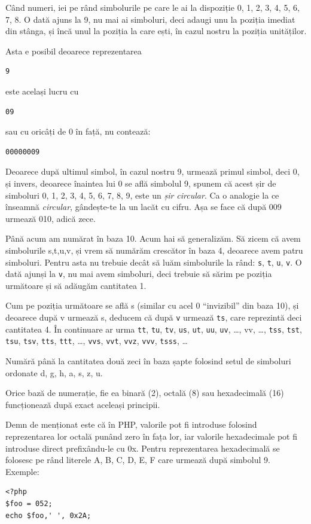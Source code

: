 Când numeri, iei pe rând simbolurile pe care le ai la dispoziție 0, 1, 2, 3, 4, 5, 6, 7, 8.
O dată ajuns la 9, nu mai ai simboluri, deci adaugi unu la poziția imediat din
stânga, și încă unul la poziția la care ești, în cazul nostru la poziția unităților.

Asta e posibil deoarece reprezentarea
\begin{verbatim}
9
\end{verbatim}
este același lucru cu
\begin{verbatim}
09
\end{verbatim}
sau cu oricâți de 0 în față, nu contează:
\begin{verbatim}
00000009
\end{verbatim}
Deoarece după ultimul simbol, în cazul nostru 9, urmează primul simbol, deci 0, și invers,
deoarece înaintea lui 0 se află simbolul 9, spunem că acest șir de simboluri
0, 1, 2, 3, 4, 5, 6, 7, 8, 9, este un \textsl{șir circular}. Ca o analogie
la ce înseamnă \textit{circular}, gândește-te la un lacăt cu cifru.
Așa se face că după 009 urmează 010, adică zece.

Până acum am numărat în baza 10. Acum hai să generalizăm. Să zicem că avem
simbolurile s,t,u,v, și vrem să numărăm crescător în baza 4, deoarece avem
patru simboluri. Pentru asta nu trebuie decât să luăm simbolurile la rând:
\texttt{s}, \texttt{t}, \texttt{u}, \texttt{v}.
O dată ajunși la \texttt{v}, nu mai avem simboluri, deci trebuie să sărim
pe poziția următoare și să adăugăm cantitatea 1.

Cum pe poziția următoare
se află s (similar cu acel 0 ``invizibil'' din baza 10), și deoarece după v
urmează s, deducem că după \texttt{v} urmează \texttt{ts}, care reprezintă
deci cantitatea 4. În continuare ar urma
\texttt{tt}, \texttt{tu}, \texttt{tv}, 
\texttt{us}, \texttt{ut}, \texttt{uu}, \texttt{uv}, \ldots, vv, \ldots,
\texttt{tss}, \texttt{tst}, \texttt{tsu}, \texttt{tsv},
\texttt{tts}, \texttt{ttt}, \ldots, \texttt{vvs}, \texttt{vvt},
\texttt{vvz}, \texttt{vvv}, \texttt{tsss}, \ldots

\begin{Exercise}[title={Numără în baza șapte},difficulty=2]
Numără până la cantitatea două zeci în baza șapte folosind setul
de simboluri ordonate d, g, h, a, s, z, u.
\end{Exercise}

Orice bază de numerație, fie ea binară (2), octală (8) sau
hexadecimală (16) funcționează după exact aceleași principii.

Demn de menționat este că în PHP, valorile pot fi introduse
folosind reprezentarea lor octală punând zero în fața lor, iar
valorile hexadecimale pot fi introduse direct prefixându-le cu 0x.
Pentru reprezentarea hexadecimală se folosesc pe rând literele A, B, C,
D, E, F care urmează după simbolul 9.
Exemple:
\begin{lstlisting}
<?php
$foo = 052;
echo $foo,' ', 0x2A;
\end{lstlisting}


